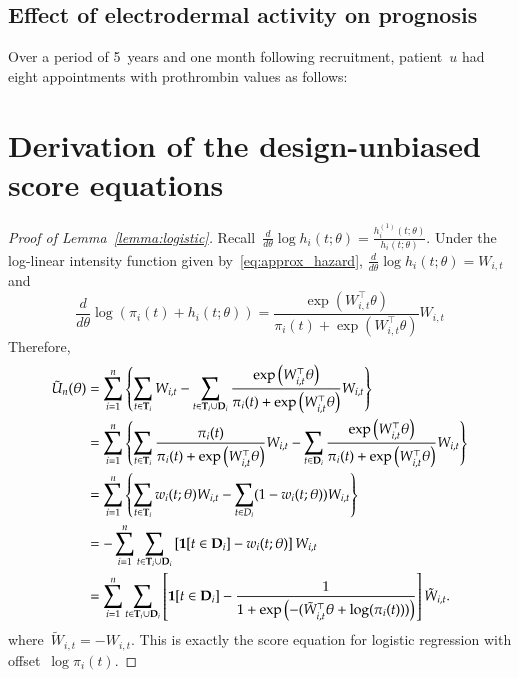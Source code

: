 \documentclass[11pt]{amsart}
\def\bfT{{\bf T}}
\def\bfD{{\bf D}}
\begin{document}
\subsection{Effect of electrodermal activity on prognosis}
Over a period of 5~years and one month following recruitment,
patient~$u$ had eight appointments with prothrombin values as follows:




\appendix

\section{Derivation of the design-unbiased score equations}

\begin{proof}[Proof of Lemma~\ref{lemma:logistic}]
Recall~$\frac{d}{d\theta} \log h_i (t; \theta) = \frac{h^{(1)}_i (t; \theta)}{h_i (t; \theta)}$. Under the log-linear intensity function given by~\eqref{eq:approx_hazard}, $\frac{d}{d\theta} \log h_i (t; \theta) = W_{i,t}$ and
\[
\frac{d}{d \theta} \log \left( \pi_i (t) + h_i (t;\theta) \right) =
\frac{\exp \left( W_{i,t}^\top \theta \right)}{\pi_i (t) + \exp
  \left( W_{i,t}^\top \theta \right)} W_{i,t}
\]
Therefore,
\begin{align*}
\tilde U_n (\theta)
  &= \sum_{i=1}^n \left \{ \sum_{t \in \bfT_i} W_{i,t} - \sum_{t \in \bfT_i \cup \bfD_i} \frac{\exp \left( W_{i,t}^\top \theta \right)}{\pi_i (t) + \exp \left( W_{i,t}^\top \theta \right)}  W_{i,t} \right \} \\
  &= \sum_{i=1}^n \left \{ \sum_{t \in \bfT_i} \frac{\pi_i (t)}{\pi_i (t) + \exp \left( W_{i,t}^\top \theta \right)} W_{i,t} - \sum_{t \in \bfD_i} \frac{\exp \left( W_{i,t}^\top \theta \right)}{\pi_i (t) + \exp \left( W_{i,t}^\top \theta \right)} W_{i,t} \right \} \\
  &= \sum_{i=1}^n \left \{ \sum_{t \in \bfT_i} w_{i} (t; \theta) W_{i,t} -
    \sum_{t \in D_i} (1 - w_i (t; \theta)) W_{i,t} \right \} \\
  &= - \sum_{i=1}^n \sum_{t \in \bfT_i \cup \bfD_i} \left[ {\bf 1} [t \in \bfD_i]  - w_{i} (t; \theta) \right] W_{i,t} \\
  &= \sum_{i=1}^n \sum_{t \in \bfT_i \cup \bfD_i}
    \left[ {\bf 1} [t \in \bfD_i]  - \frac{1}{1 + \exp\left( - (
          \tilde W_{i,t}^\top \theta + \log (\pi_i (t) ) ) \right)}
    \right] \tilde W_{i,t}.
\end{align*}
where~$\tilde W_{i,t} = - W_{i,t}$. This is exactly the score equation
for logistic regression with offset~$\log \pi_i (t)$.
\end{proof}
\end{document}
